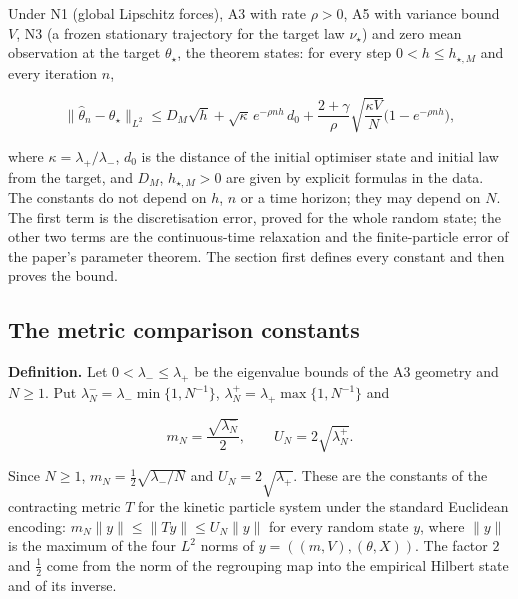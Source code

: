 \documentclass[11pt,a4paper]{report}
\begin{document}
Under N1 (global Lipschitz forces), A3 with rate \(\rho>0\), A5 with variance bound \(V\), N3 (a frozen stationary trajectory for the target law \(\nu_\star\)) and zero mean observation at the target \(\theta_\star\), the theorem states: for every step \(0<h\le h_{\star,M}\) and every iteration \(n\),


\[\|\hat\theta_n-\theta_\star\|_{L^2}\le D_M\sqrt h+\sqrt\kappa\,e^{-\rho nh}\,d_0+\frac{2+\gamma}{\rho}\sqrt{\frac{\kappa V}{N}}\bigl(1-e^{-\rho nh}\bigr),\]


where \(\kappa=\lambda_+/\lambda_-\), \(d_0\) is the distance of the initial optimiser state and initial law from the target, and \(D_M\), \(h_{\star,M}>0\) are given by explicit formulas in the data. The constants do not depend on \(h\), \(n\) or a time horizon; they may depend on \(N\). The first term is the discretisation error, proved for the whole random state; the other two terms are the continuous-time relaxation and the finite-particle error of the paper's parameter theorem. The section first defines every constant and then proves the bound.

\subsection{\texorpdfstring{The metric comparison constants}{The metric comparison constants}}


\textbf{Definition.} Let \(0<\lambda_-\le\lambda_+\) be the eigenvalue bounds of the A3 geometry and \(N\ge1\). Put \(\lambda_N^-=\lambda_-\min\{1,N^{-1}\}\), \(\lambda_N^+=\lambda_+\max\{1,N^{-1}\}\) and


\[m_N=\frac{\sqrt{\lambda_N^-}}{2},\qquad U_N=2\sqrt{\lambda_N^+}.\]


Since \(N\ge1\), \(m_N=\tfrac12\sqrt{\lambda_-/N}\) and \(U_N=2\sqrt{\lambda_+}\). These are the constants of the contracting metric \(T\) for the kinetic particle system under the standard Euclidean encoding: \(m_N\|y\|\le\|Ty\|\le U_N\|y\|\) for every random state \(y\), where \(\|y\|\) is the maximum of the four \(L^2\) norms of \(y=((m,V),(\theta,X))\). The factor \(2\) and \(\tfrac12\) come from the norm of the regrouping map into the empirical Hilbert state and of its inverse.
\end{document}
